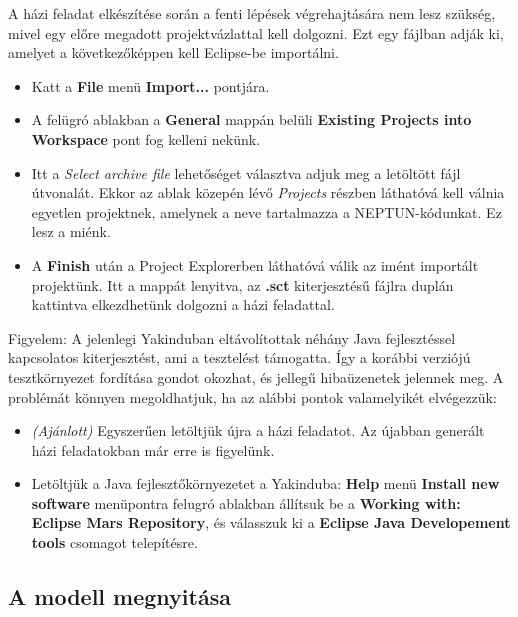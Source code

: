A házi feladat elkészítése során a fenti lépések végrehajtására nem lesz szükség, mivel egy előre megadott projektvázlattal kell dolgozni. Ezt egy  fájlban adják ki, amelyet a következőképpen kell Eclipse-be importálni.

\begin{itemize}
	\item Katt a \textbf{File} menü \textbf{Import...} pontjára.
	\item A felügró ablakban a \textbf{General} mappán belüli \textbf{Existing Projects into Workspace} pont fog kelleni nekünk.
	\item Itt a \emph{Select archive file} lehetőséget választva adjuk meg a letöltött  fájl útvonalát. Ekkor az ablak közepén lévő \emph{Projects} részben láthatóvá kell válnia egyetlen projektnek, amelynek a neve tartalmazza a NEPTUN-kódunkat. Ez lesz a miénk.
	\item A \textbf{Finish} után a Project Explorerben láthatóvá válik az imént importált projektünk. Itt a mappát lenyitva, az \textbf{.sct} kiterjesztésű fájlra duplán kattintva elkezdhetünk dolgozni a házi feladattal.
\end{itemize}

\begin{megjegyzes}
Figyelem: A jelenlegi Yakinduban eltávolítottak néhány Java fejlesztéssel kapcsolatos kiterjesztést, ami a tesztelést támogatta. Így a korábbi verziójú tesztkörnyezet fordítása gondot okozhat, és  jellegű hibaüzenetek jelennek meg. A problémát könnyen megoldhatjuk, ha az alábbi pontok valamelyikét elvégezzük:
\begin{itemize}
  \item \emph {(Ajánlott)} Egyszerűen letöltjük újra a házi feladatot. Az újabban generált házi feladatokban már erre is figyelünk.
  \item Letöltjük a Java fejlesztőkörnyezetet a Yakinduba: \textbf{Help} menü  \textbf{Install new software} menüpontra felugró ablakban állítsuk be a \textbf{Working with: Eclipse Mars Repository}, és válasszuk ki a \textbf{Eclipse Java Developement tools} csomagot telepítésre.
\end{itemize}
\end{megjegyzes}


\subsection{A modell megnyitása}

